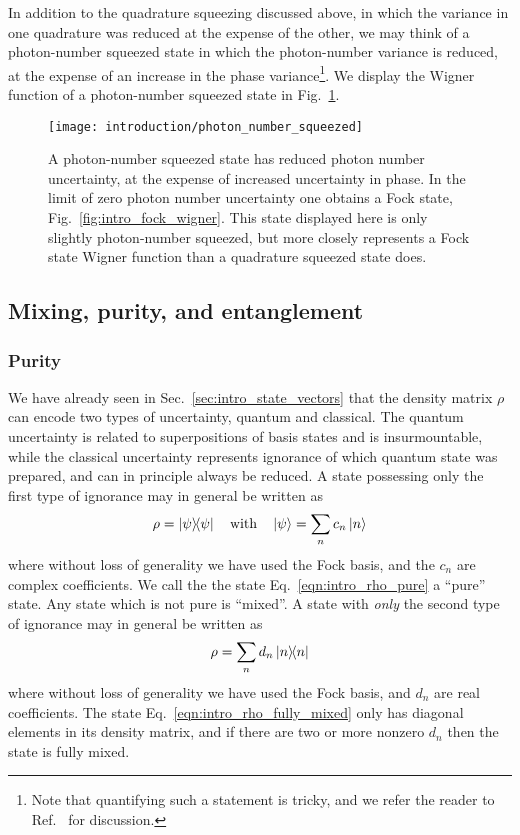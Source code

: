 In addition to the quadrature squeezing discussed above, in which the variance in one quadrature was reduced at the expense of the other, we may think of a photon-number squeezed state in which the photon-number variance is reduced, at the expense of an increase in the phase variance\footnote{Note that quantifying such a statement is tricky, and we refer the reader to Ref.~\cite{Barnett_red_book} for discussion.}. We display the Wigner function of a photon-number squeezed state in Fig.~\ref{fig:intro_photon_number_squeezed_wigner}.

\begin{figure}[htp]
\centering
\captionsetup{width=0.8\linewidth}
\texttt{[image: introduction/photon\_number\_squeezed]}
\caption{\label{fig:intro_photon_number_squeezed_wigner} A photon-number squeezed state has reduced photon number uncertainty, at the expense of increased uncertainty in phase. In the limit of zero photon number uncertainty one obtains a Fock state, Fig.~\ref{fig:intro_fock_wigner}. This state displayed here is only slightly photon-number squeezed, but more closely represents a Fock state Wigner function than a quadrature squeezed state does. }
\end{figure}



\FloatBarrier
\subsection{Mixing, purity, and entanglement}

\subsubsection{Purity}
We have already seen in Sec.~\ref{sec:intro_state_vectors} that the density matrix $\rho$ can encode two types of uncertainty, quantum and classical. The quantum uncertainty is related to superpositions of basis states and is insurmountable, while the classical uncertainty represents ignorance of which quantum state was prepared, and can in principle always be reduced. A state possessing only the first type of ignorance may in general be written as
\begin{equation}\label{eqn:intro_rho_pure}
\rho = \dyad{\psi} \qq{with} \ket{\psi} = \sum_n c_n \ket{n}
\end{equation}
where without loss of generality we have used the Fock basis, and the $c_n$ are complex coefficients. We call the the state Eq.~\ref{eqn:intro_rho_pure} a ``pure'' state. Any state which is not pure is ``mixed''. A state with \emph{only} the second type of ignorance may in general be written as
\begin{equation}\label{eqn:intro_rho_fully_mixed}
\rho = \sum_n d_n \dyad{n}
\end{equation}
where without loss of generality we have used the Fock basis, and $d_n$ are real coefficients. The state Eq.~\ref{eqn:intro_rho_fully_mixed} only has diagonal elements in its density matrix, and if there are two or more nonzero $d_n$ then the state is fully mixed.

